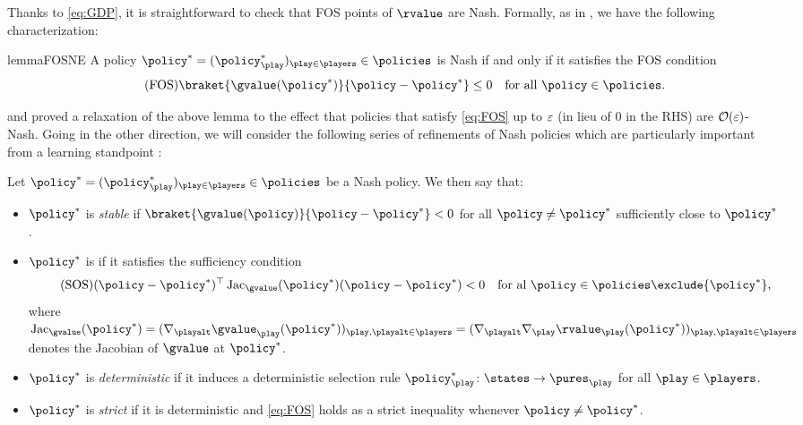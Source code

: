 Thanks to \eqref{eq:GDP}, it is straightforward to check that \ac{FOS} points of $\rvalue$ are Nash.
Formally, as in \cite{daskalakis2020independent,LOPP22,zhang2021gradient}, we have the following characterization:

\begin{restatable}{lemma}{FOSNE}
\label{lem:fos2ne}
A policy $\eq = (\eq_{\play})_{\play \in \players} \in \policies$ is Nash if and only if it satisfies the \acl{FOS} condition
\begin{equation}
\label{eq:FOS}
\tag{FOS}
\braket{\gvalue(\eq)}{\policy - \eq}
	\leq 0
	\quad
	\text{for all $\policy\in\policies$}.
\end{equation}
\end{restatable}

\citet{LOPP22} and \citet{zhang2021gradient} proved a relaxation of the above lemma to the effect that policies that satisfy \eqref{eq:FOS} up to $\varepsilon$ (\ie in lieu of $0$ in the \acs{RHS}) are $\operatorname{\mathcal{O}}(\varepsilon)$-Nash.
Going in the other direction, we will consider the following series of refinements of Nash policies which are particularly important from a learning standpoint \cite{LRS19,solan2015stochastic}:

\begin{definition}
\label{def:refine}
Let $\eq = (\eq_{\play})_{\play\in\players} \in \policies$ be a Nash policy.
We then say that:
\begin{itemize}
\item
$\eq$ is \emph{stable} if $\braket{\gvalue(\policy)}{\policy - \eq} < 0$ for all $\policy\neq\eq$ sufficiently close to $\eq$.
\item
$\eq$ is  if it satisfies the sufficiency condition
\begin{equation}
\label{eq:SOS}
\tag{SOS}
\parens{\policy - \eq}^{\top} \Jac_{\gvalue}(\eq) \parens{\policy - \eq}
	< 0
	\quad
	\text{for al $\policy\in\policies\exclude{\eq}$},
\end{equation}
where $\Jac_{\gvalue}(\eq) = (\nabla_{\playalt} \gvalue_{\play}(\eq))_{\play,\playalt\in\players} = (\nabla_{\playalt} \nabla_{\play} \rvalue_{\play}(\eq))_{\play,\playalt\in\players}$ denotes the Jacobian of $\gvalue$ at $\eq$.
\item
$\eq$ is \emph{deterministic} if it induces a deterministic selection rule $\eq_{\play}\from\states\to\pures_{\play}$ for all $\play\in\players$.
\item
$\eq$ is \emph{strict} if it is deterministic and \eqref{eq:FOS} holds as a strict inequality whenever $\policy\neq\eq$.
\end{itemize}
\end{definition}

